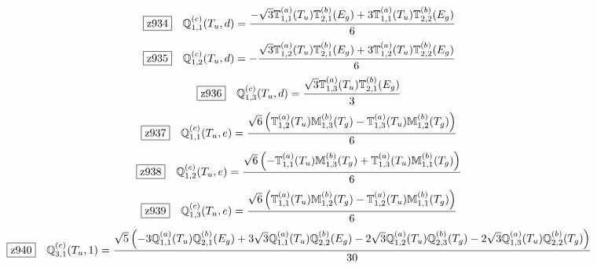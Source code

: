 \documentclass[fleqn,10pt,landscape]{jsarticle}
\begin{document}
\begin{dmath*}
\hspace*{3mm}\fbox{z934}\quad \mathbb{Q}_{1,1}^{(c)}(T_{u},d)=\frac{- \sqrt{3} \mathbb{T}_{1,1}^{(a)}(T_{u}) \mathbb{T}_{2,1}^{(b)}(E_{g}) + 3 \mathbb{T}_{1,1}^{(a)}(T_{u}) \mathbb{T}_{2,2}^{(b)}(E_{g})}{6}
\end{dmath*}
\begin{dmath*}
\hspace*{3mm}\fbox{z935}\quad \mathbb{Q}_{1,2}^{(c)}(T_{u},d)=- \frac{\sqrt{3} \mathbb{T}_{1,2}^{(a)}(T_{u}) \mathbb{T}_{2,1}^{(b)}(E_{g}) + 3 \mathbb{T}_{1,2}^{(a)}(T_{u}) \mathbb{T}_{2,2}^{(b)}(E_{g})}{6}
\end{dmath*}
\begin{dmath*}
\hspace*{3mm}\fbox{z936}\quad \mathbb{Q}_{1,3}^{(c)}(T_{u},d)=\frac{\sqrt{3} \mathbb{T}_{1,3}^{(a)}(T_{u}) \mathbb{T}_{2,1}^{(b)}(E_{g})}{3}
\end{dmath*}
\begin{dmath*}
\hspace*{3mm}\fbox{z937}\quad \mathbb{Q}_{1,1}^{(c)}(T_{u},e)=\frac{\sqrt{6} \left(\mathbb{T}_{1,2}^{(a)}(T_{u}) \mathbb{M}_{1,3}^{(b)}(T_{g}) - \mathbb{T}_{1,3}^{(a)}(T_{u}) \mathbb{M}_{1,2}^{(b)}(T_{g})\right)}{6}
\end{dmath*}
\begin{dmath*}
\hspace*{3mm}\fbox{z938}\quad \mathbb{Q}_{1,2}^{(c)}(T_{u},e)=\frac{\sqrt{6} \left(- \mathbb{T}_{1,1}^{(a)}(T_{u}) \mathbb{M}_{1,3}^{(b)}(T_{g}) + \mathbb{T}_{1,3}^{(a)}(T_{u}) \mathbb{M}_{1,1}^{(b)}(T_{g})\right)}{6}
\end{dmath*}
\begin{dmath*}
\hspace*{3mm}\fbox{z939}\quad \mathbb{Q}_{1,3}^{(c)}(T_{u},e)=\frac{\sqrt{6} \left(\mathbb{T}_{1,1}^{(a)}(T_{u}) \mathbb{M}_{1,2}^{(b)}(T_{g}) - \mathbb{T}_{1,2}^{(a)}(T_{u}) \mathbb{M}_{1,1}^{(b)}(T_{g})\right)}{6}
\end{dmath*}
\begin{dmath*}
\hspace*{3mm}\fbox{z940}\quad \mathbb{Q}_{3,1}^{(c)}(T_{u},1)=\frac{\sqrt{5} \left(- 3 \mathbb{Q}_{1,1}^{(a)}(T_{u}) \mathbb{Q}_{2,1}^{(b)}(E_{g}) + 3 \sqrt{3} \mathbb{Q}_{1,1}^{(a)}(T_{u}) \mathbb{Q}_{2,2}^{(b)}(E_{g}) - 2 \sqrt{3} \mathbb{Q}_{1,2}^{(a)}(T_{u}) \mathbb{Q}_{2,3}^{(b)}(T_{g}) - 2 \sqrt{3} \mathbb{Q}_{1,3}^{(a)}(T_{u}) \mathbb{Q}_{2,2}^{(b)}(T_{g})\right)}{30}
\end{dmath*}
\end{document}
